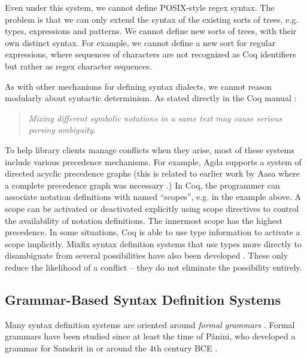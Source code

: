 Even under this system, we cannot define POSIX-style regex syntax. The problem is that we can only extend the syntax of the existing sorts of trees, e.g. types, expressions and patterns. We cannot define new sorts of trees, with their own distinct syntax. For example, we cannot define a new sort for regular expressions, where sequences of characters are not recognized as Coq identifiers but rather as regex character sequences. 

As with other mechanisms for defining syntax dialects, we cannot reason modularly about syntactic determinism. As stated directly in the Coq manual \cite{Coq:manual}: 
\begin{quote}
\emph{Mixing different symbolic notations in a same text may cause serious parsing ambiguity.}
\end{quote}

To help library clients manage conflicts when they arise, most of these systems include various precedence mechanisms. For example, Agda supports a system of directed acyclic precedence graphs \cite{DBLP:conf/ifl/DanielssonN08} (this is related to earlier work by Aasa where a complete precedence graph was necessary \cite{DBLP:journals/tcs/Aasa95}.) In Coq, the programmer can associate notation definitions with named ``scopes'', e.g.  in the example above. A scope can  be activated or deactivated explicitly using scope directives to control the availability of notation definitions. The innermost scope has the highest precedence. In some situations, Coq is able to use type information to activate a scope implicitly. Mixfix syntax definition systems that use types more directly to disambiguate from several possibilities have also been developed \cite{missura1997higher,wieland2009parsing}. These only reduce the likelihood of a conflict -- they do  not eliminate the possibility entirely.



\subsection{Grammar-Based Syntax Definition Systems}\label{sec:grammars}\label{sec:syntax-dialects}
Many syntax definition systems are oriented around \emph{formal grammars} \cite{hopcroft1979introduction}. Formal grammars have been studied since at least the time of P\~anini, who developed a grammar for Sanskrit in or around the 4th century BCE \cite{Ingerman:1967:LFS:363162.363165}. 

